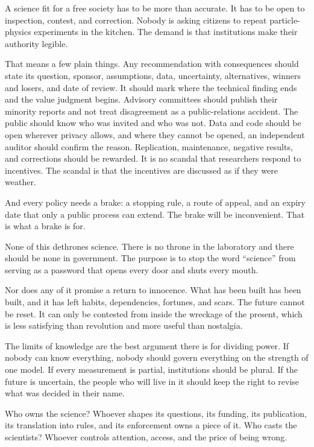 \documentclass[12pt,a4paper]{book}
\begin{document}
A science fit for a free society has to be more than accurate. It has to be open to inspection, contest, and correction. Nobody is asking citizens to repeat particle-physics experiments in the kitchen. The demand is that institutions make their authority legible.

That means a few plain things. Any recommendation with consequences should state its question, sponsor, assumptions, data, uncertainty, alternatives, winners and losers, and date of review. It should mark where the technical finding ends and the value judgment begins. Advisory committees should publish their minority reports and not treat disagreement as a public-relations accident. The public should know who was invited and who was not. Data and code should be open wherever privacy allows, and where they cannot be opened, an independent auditor should confirm the reason. Replication, maintenance, negative results, and corrections should be rewarded. It is no scandal that researchers respond to incentives. The scandal is that the incentives are discussed as if they were weather.

And every policy needs a brake: a stopping rule, a route of appeal, and an expiry date that only a public process can extend. The brake will be inconvenient. That is what a brake is for.

None of this dethrones science. There is no throne in the laboratory and there should be none in government. The purpose is to stop the word ``science'' from serving as a password that opens every door and shuts every mouth.

Nor does any of it promise a return to innocence. What has been built has been built, and it has left habits, dependencies, fortunes, and scars. The future cannot be reset. It can only be contested from inside the wreckage of the present, which is less satisfying than revolution and more useful than nostalgia.

The limits of knowledge are the best argument there is for dividing power. If nobody can know everything, nobody should govern everything on the strength of one model. If every measurement is partial, institutions should be plural. If the future is uncertain, the people who will live in it should keep the right to revise what was decided in their name.

Who owns the science? Whoever shapes its questions, its funding, its publication, its translation into rules, and its enforcement owns a piece of it. Who casts the scientists? Whoever controls attention, access, and the price of being wrong.
\end{document}
